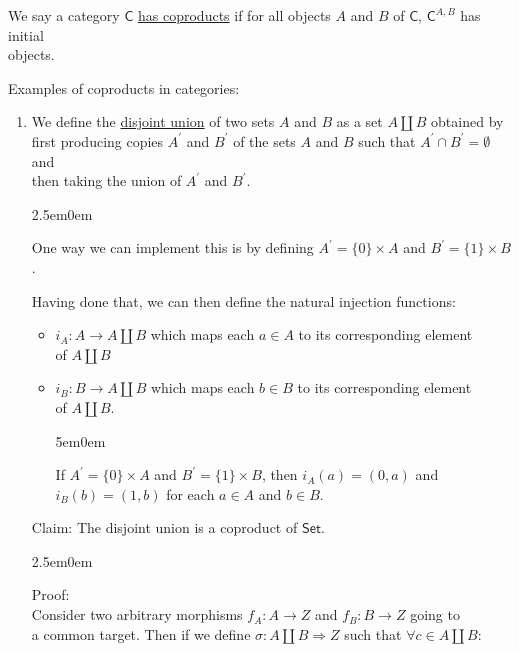 \documentclass{book}
\newcommand{\exOne}{%
   \color{Purple}%
   \fontsize{14}{16}\selectfont%
}
\newcommand{\exTwo}{%
   \color{RedViolet}%
   \fontsize{13}{15}\selectfont%
}
\newenvironment{myIndent}{%
   \begin{adjustwidth}{2.5em}{0em}%
}{%
   \end{adjustwidth}%
}
\newenvironment{myDindent}{%
   \begin{adjustwidth}{5em}{0em}%
}{%
   \end{adjustwidth}%
}
\newcommand{\udefine}[1]{{%
   \setulcolor{Red}%
   \setul{0.14em}{0.07em}%
   \ul{#1}%
}}
\newcommand{\mcateg}[1]{{\bm{\mathsf{#1}}}}
\newcommand{\retTwo}{\hfill\bigbreak}
\begin{document}
We say a category $\mcateg{C}$ \udefine{has coproducts} if for all objects $A$ and $B$ of $\mcateg{C}$, $\mcateg{C}^{A,B}$ has initial\\ objects.\retTwo

\exOne
Examples of coproducts in categories:

\begin{enumerate}
   \item We define the \udefine{disjoint union} of two sets $A$ and $B$ as a set $A \amalg B$ obtained by\\ first producing copies $A^\prime$ and $B^\prime$ of the sets $A$ and $B$ such that $A^\prime \cap B^\prime = \emptyset$ and\\ then taking the union of $A^\prime$ and $B^\prime$.\\ [-20pt]
   {\begin{myIndent} \exTwo
      One way we can implement this is by defining $A^\prime = \{0\} \times A$ and $B^\prime = \{1\} \times B$.
      \retTwo
   \end{myIndent}}

   Having done that, we can then define the natural injection functions:
   \begin{itemize}
      \item $i_A: A \longrightarrow A \amalg B$ which maps each $a \in A$ to its corresponding element\\ of $A \amalg B$
      \item $i_B: B \longrightarrow A \amalg B$ which maps each $b \in B$ to its corresponding element\\ of $A \amalg B$.
      {\begin{myDindent} \exTwo
         If $A^\prime = \{0\}\times A$ and $B^\prime = \{1\} \times B$, then $i_A(a) = (0, a)$ and\\ $i_B(b) = (1, b)$ for each $a \in A$ and $b \in B$.\retTwo
      \end{myDindent}}
   \end{itemize}

   Claim: The disjoint union is a coproduct of $\mcateg{Set}$.
   {\begin{myIndent} \exTwo
      Proof:\\
      Consider two arbitrary morphisms $f_A: A \longrightarrow Z$ and $f_B: B \longrightarrow Z$ going to\\ a common target. Then if we define $\sigma: A \amalg B \Longrightarrow Z$ such that $\forall c \in A \amalg B$:\\


\end{myIndent}}
\end{enumerate}
\end{document}
